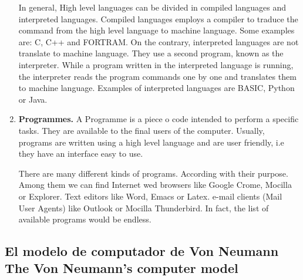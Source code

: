 \begin{paracol}{2}
\begin{enumerate}
In general, High level languages can be divided in compiled languages and interpreted languages. Compiled languages employs a compiler to traduce the command from the high level language to machine language. Some examples are: C, C++ and FORTRAM. On the contrary, interpreted languages are not translate to machine language. They use a second program, known as the interpreter. While a program  written in the interpreted language is running, the interpreter reads the program commands one by one and translates them to machine language. Examples of interpreted languages are BASIC, Python or Java.  


\item \textbf{Programmes.}  
A Programme is a piece o code intended to perform a specific tasks.  They are available to the final users of the computer. Usually, programs are written using a high level language and are user friendly, i.e they have an interface easy to use.

There are many different kinds of programs. According with their purpose. Among them we can find Internet wed browsers like Google Crome, Mocilla or Explorer. Text editors like Word, Emacs or Latex.    
e-mail clients (Mail User Agents) like Outlook or Mocilla Thunderbird. In fact, the list of available programs would be endless. 
\end{enumerate}

\end{paracol}


\subsection{El modelo de computador de Von Neumann\\ The Von Neumann's computer model} 

